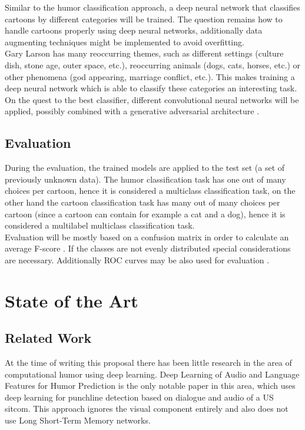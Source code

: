 \documentclass[draft,final,oneside]{vutinfth} %
\begin{document}
Similar to the humor classification approach, a deep neural network that classifies cartoons by different categories will be trained. The question remains how to handle cartoons properly using deep neural networks, additionally data augmenting techniques might be implemented to avoid overfitting. \\

Gary Larson has many reoccurring themes, such as different settings (culture dish, stone age, outer space, etc.), reoccurring animals (dogs, cats, horses, etc.) or other phenomena (god appearing, marriage conflict, etc.). This makes training a deep neural network which is able to classify these categories an interesting task. On the quest to the best classifier, different convolutional neural networks will be applied, possibly combined with a generative adversarial architecture \cite{gan2}\cite{gan}.

\section {Evaluation}

During the evaluation, the trained models are applied to the test set (a set of previously unknown data). The humor classification task has one out of many choices per cartoon, hence it is considered a multiclass classification task, on the other hand the cartoon classification task has many out of many choices per cartoon (since a cartoon can contain for example a cat and a dog), hence it is considered a multilabel multiclass classification task. \\

Evaluation will be mostly based on a confusion matrix in order to calculate an average F-score \cite{Powers2008EvaluationFP}. If the classes are not evenly distributed special considerations are necessary. Additionally ROC curves may be also used for evaluation \cite{Hand2001}. 

\chapter{State of the Art}

\section{Related Work}
At the time of writing this proposal there has been little research in the area of computational humor using deep learning. Deep Learning of Audio and Language Features for Humor Prediction \cite{Bertero2016DeepLO} is the only notable paper in this area, which uses deep learning for punchline detection based on dialogue and audio of a US sitcom. This approach ignores the visual component entirely and also does not use Long Short-Term Memory networks.
\end{document}
